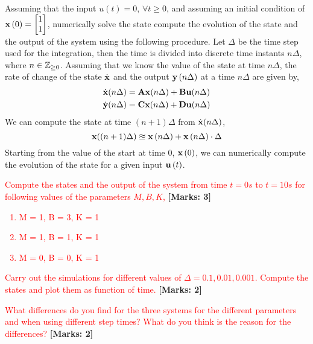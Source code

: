 \documentclass[12pt]{article}
\def\mf{\ensuremath\mathbf}
\def\mb{\ensuremath\mathbb}
\def\lp{\ensuremath\left(}
\def\rp{\ensuremath\right)}
\def\bmx{\ensuremath\begin{bmatrix*}[r]}
\def\emx{\ensuremath\end{bmatrix*}}
\begin{document}
\begin{enumerate}
    Assuming that the input $u(t) = 0$, $\forall t \geq 0$, and assuming an initial condition of $\mf{x}\lp 0 \rp = \bmx 1 \\ 1\emx$, numerically solve the state compute the evolution of the state and the output of the system using the following procedure. Let $\Delta$ be the time step used for the integration, then the time is divided into discrete time instants $n \Delta$, where $n \in \mb{Z}_{\geq 0}$. Assuming that we know the value of the state at time $n\Delta$, the rate of change of the state $\dot{\mf{x}}$ and the output $\mf{y}\lp n\Delta \rp$ at a time $n \Delta$ are given by,
    \[ \begin{split}
        \dot{\mf{x}}( n \Delta ) &= \mf{A} \mf{x}(n \Delta) + \mf{B}\mf{u}(n \Delta) \\
        \dot{\mf{y}}( n \Delta ) &= \mf{C} \mf{x}(n \Delta) + \mf{D}\mf{u}(n \Delta)
        \end{split} \]
    We can compute the state at time $(n+1)\Delta$ from $\dot{\mf{x}}(n \Delta)$,
    \[ \mf{x}((n+1)\Delta) \approxeq \mf{x}\lp n\Delta\rp + \mf{x}\lp n\Delta \rp \cdot \Delta \]
    Starting from the value of the start at time $0$, $\mf{x}\lp 0 \rp$, we can numerically compute the evolution of the state for a given input $\mf{u}\lp t \rp$.

    \textcolor{red}{Compute the states and the output of the system from time $t = 0 s$ to $t = 10s$ for following values of the parameters $M, B, K$,} \textbf{[Marks: 3]}
    \textcolor{red}{\begin{enumerate}
        \item M = 1, B = 3, K = 1
        \item M = 1, B = 1, K = 1
        \item M = 0, B = 0, K = 1
    \end{enumerate}}

    \textcolor{red}{Carry out the simulations for different values of $\Delta = 0.1, 0.01, 0.001$. Compute the states and plot them as function of time.} \textbf{[Marks: 2]}

    \textcolor{red}{What differences do you find for the three systems for the different parameters and when using different step times? What do you think is the reason for the differences?} \textbf{[Marks: 2]}
\end{enumerate}
\end{document}
